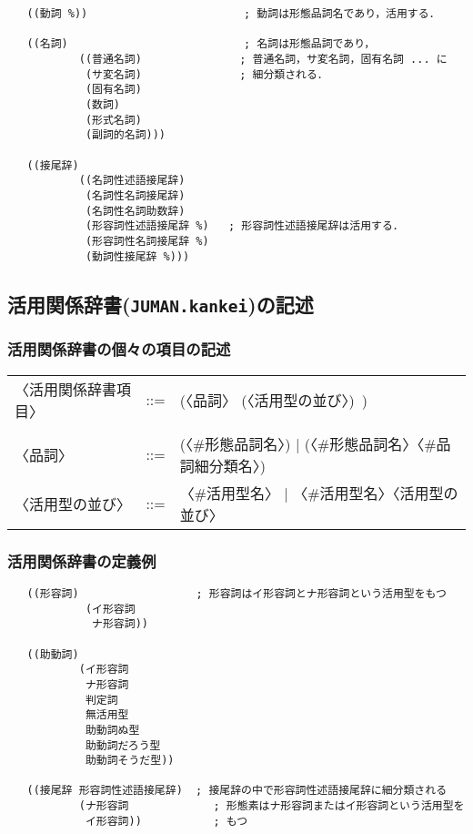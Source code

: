 \documentclass[a4j,titlepage]{jarticle}
\begin{document}
\begin{verbatim}
   ((動詞 %))                        ; 動詞は形態品詞名であり，活用する．

   ((名詞)                           ; 名詞は形態品詞であり，
           ((普通名詞)               ; 普通名詞，サ変名詞，固有名詞 ... に
            (サ変名詞)               ; 細分類される．
            (固有名詞)
            (数詞)
            (形式名詞)
            (副詞的名詞)))

   ((接尾辞)
           ((名詞性述語接尾辞)
            (名詞性名詞接尾辞)
            (名詞性名詞助数辞)
            (形容詞性述語接尾辞 %)   ; 形容詞性述語接尾辞は活用する．
            (形容詞性名詞接尾辞 %)
            (動詞性接尾辞 %)))
\end{verbatim}

\clearpage

\subsection{活用関係辞書({\tt JUMAN.kankei})の記述}\label{app:kankei}

\subsubsection{活用関係辞書の個々の項目の記述}

\begin{tt}
\begin{tabular}{lll}
〈活用関係辞書項目〉& ::= & (〈品詞〉 (〈活用型の並び〉)\ ) \\
\\
〈品詞〉        & ::= & (〈\#形態品詞名〉) | 
                        (〈\#形態品詞名〉〈\#品詞細分類名〉)\\
〈活用型の並び〉& ::= & 〈\#活用型名〉 | 〈\#活用型名〉〈活用型の並び〉\\
\end{tabular}
\end{tt}

\subsubsection{活用関係辞書の定義例}

\begin{verbatim}
   ((形容詞)                  ; 形容詞はイ形容詞とナ形容詞という活用型をもつ
            (イ形容詞
             ナ形容詞))

   ((助動詞)
           (イ形容詞
            ナ形容詞
            判定詞
            無活用型
            助動詞ぬ型
            助動詞だろう型
            助動詞そうだ型))

   ((接尾辞 形容詞性述語接尾辞)  ; 接尾辞の中で形容詞性述語接尾辞に細分類される
           (ナ形容詞             ; 形態素はナ形容詞またはイ形容詞という活用型を
            イ形容詞))           ; もつ
\end{verbatim}
\end{document}
